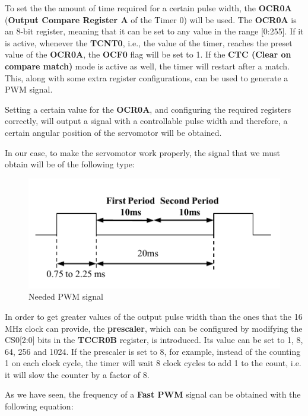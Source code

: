 To set the the amount of time required for a certain pulse width, the \textbf{OCR0A} (\textbf{Output Compare Register A} of the Timer 0) will be used. The \textbf{OCR0A} is an 8-bit register, meaning that it can be set to any value in the range [0:255]. If it is active, whenever the \textbf{TCNT0}, i.e., the value of the timer, reaches the preset value of the \textbf{OCR0A}, the \textbf{OCF0} flag will be set to 1. If the \textbf{CTC (Clear on compare match)} mode is active as well, the timer will restart after a match. This, along with some extra register configurations, can be used to generate a PWM signal.\medskip

Setting a certain value for the \textbf{OCR0A}, and configuring the required registers correctly, will output a signal with a controllable pulse width and therefore, a certain angular position of the servomotor will be obtained.\medskip

In our case, to make the servomotor work properly, the signal that we must obtain will be of the following type: \medskip

\begin{figure}[H]
    \centering
    \includegraphics[scale = 1.1]{Graphics/MICROS/Practice 4/SERVO_TIMING.pdf}
    \caption{Needed PWM signal}
    \label{fig:PWM_NEEDED}
\end{figure}


In order to get greater values of the output pulse width than the ones that the 16 MHz clock can provide, the \textbf{prescaler}, which can be configured by modifying the CS0[2:0] bits in the \textbf{TCCR0B} register, is introduced. Its value can be set to 1, 8, 64, 256 and 1024. If the prescaler is set to 8, for example, instead of the counting 1 on each clock cycle, the timer will wait 8 clock cycles to add 1 to the count, i.e. it will slow the counter by a factor of 8.\medskip

As we have seen, the frequency of a \textbf{Fast PWM} signal can be obtained with the following equation:

